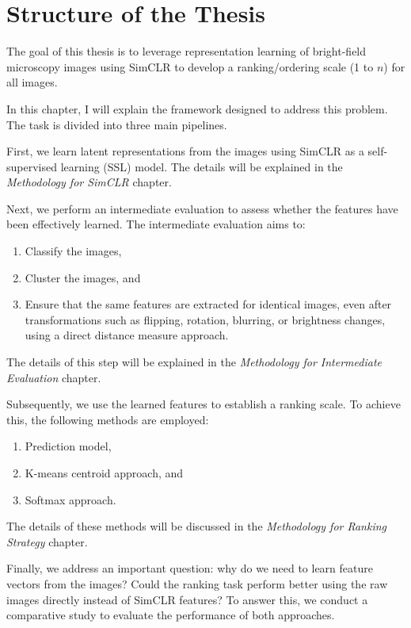 \chapter{Structure of the Thesis}\label{ch:Structure of the Thesis}

The goal of this thesis is to leverage representation learning of bright-field microscopy images using SimCLR to develop a ranking/ordering scale 
(1 to \( n \)) for all images. 

In this chapter, I will explain the framework designed to address this problem. The task is divided into three main pipelines.

First, we learn latent representations from the images using SimCLR as a self-supervised learning (SSL) model. The details will be explained in the 
\textit{Methodology for SimCLR} chapter.

Next, we perform an intermediate evaluation to assess whether the features have been effectively learned. The intermediate evaluation aims to:

\begin{enumerate}
    \item Classify the images,
    \item Cluster the images, and
    \item Ensure that the same features are extracted for identical images, even after transformations such as flipping, rotation, blurring, or brightness changes,
     using a direct distance measure approach.
\end{enumerate}

The details of this step will be explained in the \textit{Methodology for Intermediate Evaluation} chapter.

Subsequently, we use the learned features to establish a ranking scale. To achieve this, the following methods are employed:

\begin{enumerate}
    \item Prediction model,
    \item K-means centroid approach, and
    \item Softmax approach.
\end{enumerate}

The details of these methods will be discussed in the \textit{Methodology for Ranking Strategy} chapter.

Finally, we address an important question: why do we need to learn feature vectors from the images? Could the ranking task perform better using the raw images 
directly instead of SimCLR features? To answer this, we conduct a comparative study to evaluate the performance of both approaches.


